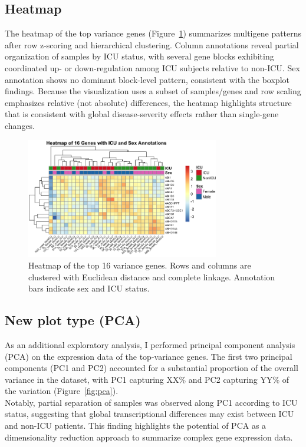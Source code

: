 \documentclass[11pt]{article}
\begin{document}
\subsection{Heatmap}
The heatmap of the top variance genes (Figure~\ref{fig:heatmap}) summarizes multigene patterns after row z-scoring and hierarchical clustering. Column annotations reveal partial organization of samples by ICU status, with several gene blocks exhibiting coordinated up- or down-regulation among ICU subjects relative to non-ICU. Sex annotation shows no dominant block-level pattern, consistent with the boxplot findings. Because the visualization uses a subset of samples/genes and row scaling emphasizes relative (not absolute) differences, the heatmap highlights structure that is consistent with global disease-severity effects rather than single-gene changes.
\begin{figure}[H]
\centering
\includegraphics[width=0.75\textwidth]{fig4_heatmap.png}
\caption{Heatmap of the top 16 variance genes. Rows and columns are clustered with Euclidean distance and complete linkage. Annotation bars indicate sex and ICU status.}
\label{fig:heatmap}
\end{figure}

\subsection{New plot type (PCA)}
As an additional exploratory analysis, I performed principal component analysis (PCA) on the expression data of the top-variance genes. 
The first two principal components (PC1 and PC2) accounted for a substantial proportion of the overall variance in the dataset, with PC1 capturing XX\% and PC2 capturing YY\% of the variation (Figure~\ref{fig:pca}). \\
Notably, partial separation of samples was observed along PC1 according to ICU status, suggesting that global transcriptional differences may exist between ICU and non-ICU patients. 
This finding highlights the potential of PCA as a dimensionality reduction approach to summarize complex gene expression data.
\end{document}

